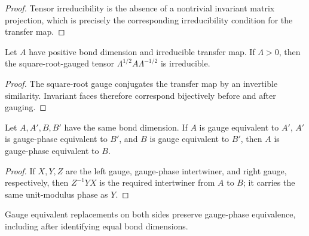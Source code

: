 \begin{proof}
    \leanok
    Tensor irreducibility is the absence of a nontrivial invariant matrix
    projection, which is precisely the corresponding irreducibility condition
    for the transfer map.
\end{proof}

\begin{lemma}
    \label{lem:tp_gauge_preserves_irreducibility}
    \leanok
    Let $A$ have positive bond dimension and irreducible transfer map. If
    $\Lambda>0$, then the square-root-gauged tensor
    $\Lambda^{1/2}A\Lambda^{-1/2}$ is irreducible.
\end{lemma}

\begin{proof}
    \leanok
    The square-root gauge conjugates the transfer map by an invertible
    similarity. Invariant faces therefore correspond bijectively before and
    after gauging.
\end{proof}

\begin{lemma}
    \label{lem:gauge_phase_equiv_transport_same_dimension}
    \leanok
    Let $A,A',B,B'$ have the same bond dimension. If $A$ is gauge equivalent
    to $A'$, $A'$ is gauge-phase equivalent to $B'$, and $B$ is gauge
    equivalent to $B'$, then $A$ is gauge-phase equivalent to $B$.
\end{lemma}

\begin{proof}\leanok
    If $X,Y,Z$ are the left gauge, gauge-phase intertwiner, and right gauge,
    respectively, then $Z^{-1}YX$ is the required intertwiner from $A$ to $B$;
    it carries the same unit-modulus phase as $Y$.
\end{proof}

\begin{lemma}
    \label{lem:gauge_phase_equiv_transport_left_right}
    \leanok
    Gauge equivalent replacements on both sides preserve gauge-phase
    equivalence, including after identifying equal bond dimensions.
\end{lemma}

